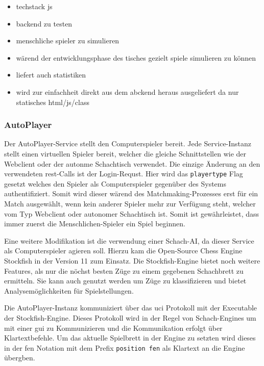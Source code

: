 \begin{itemize}
\tightlist
\item
  techstack js
\item
  backend zu testen
\item
  menschliche spieler zu simulieren
\item
  wärend der entwicklungsphase des tisches gezielt spiele simulieren zu
  können
\item
  liefert auch statistiken
\item
  wird zur einfachheit direkt aus dem abckend heraus ausgeliefert da nur
  statisches html/js/class
\end{itemize}

\hypertarget{autoplayer}{%
\subsubsection{AutoPlayer}\label{autoplayer}}

Der AutoPlayer-Service stellt den Computerspieler bereit. Jede
Service-Instanz stellt einen virtuellen Spieler bereit, welcher die
gleiche Schnittstellen wie der Webclient oder der autonme Schachtisch
verwendet. Die einzige Änderung an den verwendeten \gls{rest}-Calls ist
der Login-Requst. Hier wird das \passthrough{\lstinline!playertype!}
Flag gesetzt welches den Spieler als Computerspieler gegenüber des
Systems authentifiziert. Somit wird dieser wärend des
Matchmaking-Prozesses erst für ein Match ausgewählt, wenn kein anderer
Spieler mehr zur Verfügung steht, welcher vom Typ Webclient oder
autonomer Schachtisch ist. Somit ist gewährleistet, dass immer zuerst
die Menschlichen-Spieler ein Spiel beginnen.

Eine weitere Modifikation ist die verwendung einer Schach-AI, da dieser
Service als Computerspieler agieren soll. Hierzu kam die Open-Source
Chess Engine Stockfish\cite{stockfish} in der Version 11 zum
Einsatz. Die Stockfish-Engine bietet noch weitere Features, als nur die
nöchst besten Züge zu einem gegebenen Schachbrett zu ermitteln. Sie kann
auch genutzt werden um Züge zu klassifizieren und bietet
Analysemöglichkeiten für Spielstellungen.

Die AutoPlayer-Instanz kommuniziert über das \gls{uci}
Protokoll\cite{uciprotocol} mit der Executable der Stockfish-Engine.
Dieses Protokoll wird in der Regel von Schach-Engines um mit einer
\gls{gui} zu Kommunizieren und die Kommunikation erfolgt über
Klartextbefehle. Um das aktuelle Spielbrett in der Engine zu setzten
wird dieses in der \gls{fen} Notation mit dem Prefix
\passthrough{\lstinline!position fen!} als Klartext an die Engine
übergben.

